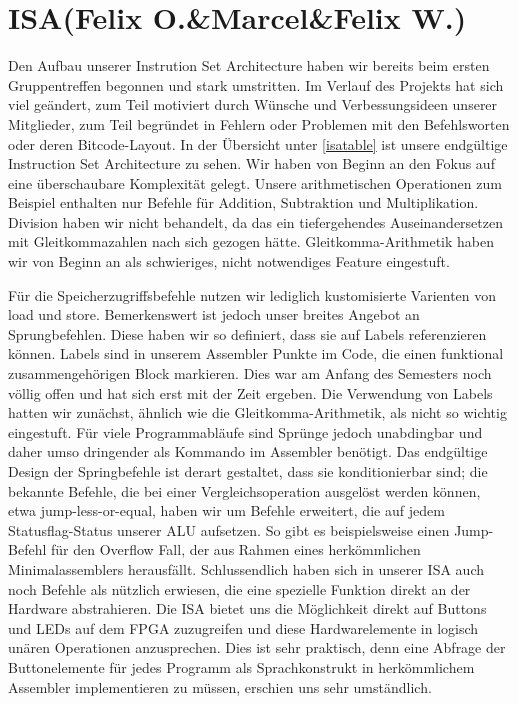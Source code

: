 
\section{ISA(Felix O.\&Marcel\&Felix W.)}

Den Aufbau unserer Instrution Set Architecture haben wir bereits beim ersten Gruppentreffen begonnen und stark umstritten. Im Verlauf des Projekts hat sich viel geändert, zum Teil motiviert durch Wünsche und Verbessungsideen unserer Mitglieder, zum Teil begründet in Fehlern oder Problemen mit den Befehlsworten oder deren Bitcode-Layout.
In der Übersicht unter \ref{isatable} ist unsere endgültige Instruction Set Architecture zu sehen. Wir haben von Beginn an den Fokus auf eine überschaubare Komplexität gelegt. Unsere arithmetischen Operationen zum Beispiel enthalten nur Befehle für Addition, Subtraktion und Multiplikation. Division haben wir nicht behandelt, da das ein tiefergehendes Auseinandersetzen mit Gleitkommazahlen nach sich gezogen hätte. Gleitkomma-Arithmetik haben wir von Beginn an als schwieriges, nicht notwendiges Feature eingestuft.

Für die Speicherzugriffsbefehle nutzen wir lediglich kustomisierte Varienten von load und store. Bemerkenswert ist jedoch unser breites Angebot an Sprungbefehlen. Diese haben wir so definiert, dass sie auf Labels referenzieren können. Labels sind in unserem Assembler Punkte im Code, die einen funktional zusammengehörigen Block markieren. Dies war am Anfang des Semesters noch völlig offen und hat sich erst mit der Zeit ergeben. Die Verwendung von Labels hatten wir zunächst, ähnlich wie die Gleitkomma-Arithmetik, als nicht so wichtig eingestuft. Für viele Programmabläufe sind Sprünge jedoch unabdingbar und daher umso dringender als Kommando im Assembler benötigt. Das endgültige Design der Springbefehle ist derart gestaltet, dass sie konditionierbar sind; die bekannte Befehle, die bei einer Vergleichsoperation ausgelöst werden können, etwa jump-less-or-equal, haben wir um Befehle erweitert, die auf jedem Statusflag-Status unserer ALU aufsetzen. So gibt es beispielsweise einen Jump-Befehl für den Overflow Fall, der aus Rahmen eines herkömmlichen Minimalassemblers herausfällt.
Schlussendlich haben sich in unserer ISA auch noch Befehle als nützlich erwiesen, die eine spezielle Funktion direkt an der Hardware abstrahieren. Die ISA bietet uns die Möglichkeit direkt auf Buttons und LEDs auf dem FPGA zuzugreifen und diese Hardwarelemente in logisch unären Operationen anzusprechen. Dies ist sehr praktisch, denn eine Abfrage der Buttonelemente für jedes Programm als Sprachkonstrukt in herkömmlichem Assembler implementieren zu müssen, erschien uns sehr umständlich.


